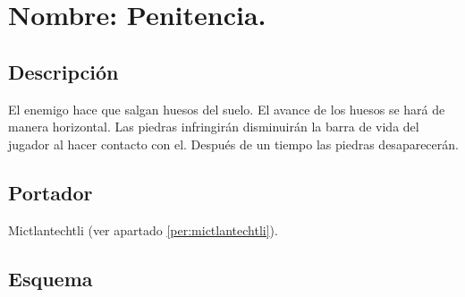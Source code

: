 \section{Nombre: Penitencia.}\label{hab.Penitencia}
\subsection{Descripción}
El enemigo hace que salgan huesos del suelo. El avance de los huesos se hará de manera horizontal. Las piedras infringirán disminuirán la barra de vida del jugador al hacer contacto con el. Después de un tiempo las piedras desaparecerán.
\subsection{Portador}
Mictlantechtli (ver apartado \ref{per:mictlantechtli}).	
\subsection{Esquema}
			
